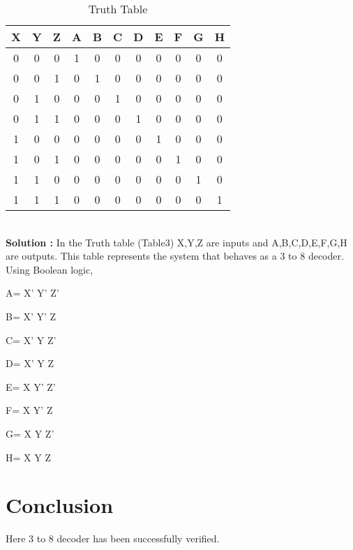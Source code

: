\documentclass[journal,12pt,twocolumn]{IEEEtran}
\begin{document}
    \begin{table}[h]
    \centering
    \begin{tabular}{| c | c | c || c | c | c | c | c | c | c | c |}
    \hline
    \textbf{X} & \textbf{Y} & \textbf{Z} & \textbf{A} & \textbf{B} & \textbf{C} & \textbf{D} & \textbf{E} & \textbf{F} & \textbf{G} & \textbf{H} \\
    \hline
    0 & 0 & 0 & 1 & 0 & 0 & 0 & 0 & 0 & 0 & 0  \\
    \hline
    0 & 0 & 1 & 0 & 1 & 0 & 0 & 0 & 0 & 0 & 0  \\
    \hline
    0 & 1 & 0 & 0 & 0 & 1 & 0 & 0 & 0 & 0 & 0  \\
    \hline
    0 & 1 & 1 & 0 & 0 & 0 & 1 & 0 & 0 & 0 & 0  \\
    \hline
    1 & 0 & 0 & 0 & 0 & 0 & 0 & 1 & 0 & 0 & 0  \\
    \hline
    1 & 0 & 1 & 0 & 0 & 0 & 0 & 0 & 1 & 0 & 0  \\
    \hline
    1 & 1 & 0 & 0 & 0 & 0 & 0 & 0 & 0 & 1 & 0  \\
    \hline
    1 & 1 & 1 & 0 & 0 & 0 & 0 & 0 & 0 & 0 & 1  \\
    \hline
    \end{tabular}
    \caption{Truth Table}
    \label{tab:my_label}
 \end{table}
 \\
\textbf{Solution :}  In the Truth table (Table3) X,Y,Z are inputs and A,B,C,D,E,F,G,H are outputs. This table represents the system that behaves as a 3 to 8 decoder. Using Boolean logic, \\
 \begin{center}
     A= X' Y' Z'\\
 \end{center}
  \begin{center}
      B= X' Y' Z\\
 \end{center}
  \begin{center}
      C= X' Y Z'\\
 \end{center}
  \begin{center}
      D= X' Y Z\\
 \end{center}
  \begin{center}
     E= X Y' Z'\\
 \end{center}
  \begin{center}
     F= X Y' Z\\
 \end{center}
  \begin{center}
     G= X Y Z'\\
 \end{center}
  \begin{center}
     H= X Y Z\\
 \end{center} 
 \section{Conclusion}
Here 3 to 8 decoder has been successfully verified.\\
\end{document}

